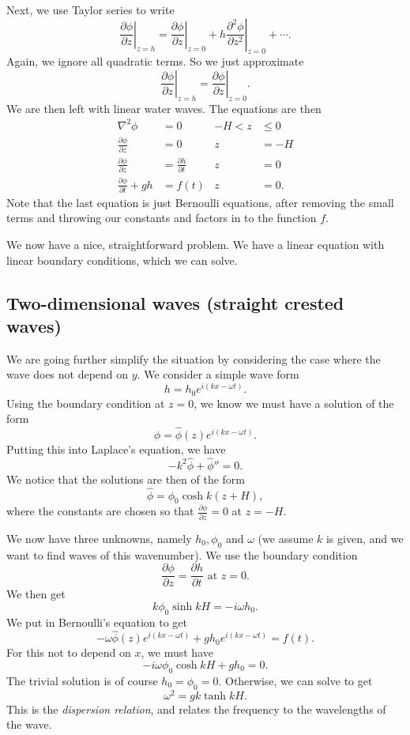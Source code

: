 \documentclass[a4paper]{article}
\begin{document}
Next, we use Taylor series to write
\[
  \left.\frac{\partial \phi}{\partial z}\right|_{z = h} = \left.\frac{\partial \phi}{\partial z}\right|_{z = 0} + h \left.\frac{\partial^2 \phi}{\partial z^2}\right|_{z = 0} + \cdots.
\]
Again, we ignore all quadratic terms. So we just approximate
\[
  \left.\frac{\partial \phi}{\partial z}\right|_{z = h} = \left.\frac{\partial \phi}{\partial z}\right|_{z = 0}.
\]
We are then left with linear water waves. The equations are then
\begin{align*}
  \nabla^2 \phi &= 0 & -H < z &\leq 0\\
  \frac{\partial \phi}{\partial z} &= 0 & z &= -H\\
  \frac{\partial \phi}{\partial z} &= \frac{\partial h}{\partial t} & z &= 0\\
  \frac{\partial \phi}{\partial t} + gh &= f(t) & z &= 0.
\end{align*}
Note that the last equation is just Bernoulli equations, after removing the small terms and throwing our constants and factors in to the function $f$.

We now have a nice, straightforward problem. We have a linear equation with linear boundary conditions, which we can solve.

\subsection{Two-dimensional waves (straight crested waves)}
We are going further simplify the situation by considering the case where the wave does not depend on $y$. We consider a simple wave form
\[
  h = h_0 e^{i(kx - \omega t)}.
\]
Using the boundary condition at $z = 0$, we know we must have a solution of the form
\[
  \phi = \hat{\phi}(z) e^{i(kx - \omega t)}.
\]
Putting this into Laplace's equation, we have
\[
  -k^2 \hat{\phi} + \hat{\phi}'' = 0.
\]
We notice that the solutions are then of the form
\[
  \hat{\phi} = \phi_0 \cosh k(z + H),
\]
where the constants are chosen so that $\frac{\partial \phi}{\partial z} = 0$ at $z = -H$.

We now have three unknowns, namely $h_0, \phi_0$ and $\omega$ (we assume $k$ is given, and we want to find waves of this wavenumber). We use the boundary condition
\[
  \frac{\partial \phi}{\partial z} = \frac{\partial h}{\partial t}\text{ at }z = 0.
\]
We then get
\[
  k \phi_0 \sinh kH = -i \omega h_0.
\]
We put in Bernoulli's equation to get
\[
  -\omega \hat{\phi}(z) e^{i(kx - \omega t)} + g h_0 e^{i(kx - \omega t)} = f(t).
\]
For this not to depend on $x$, we must have
\[
  -i\omega \phi_0 \cosh kH + gh_0 = 0.
\]
The trivial solution is of course $h_0 = \phi_0 = 0$. Otherwise, we can solve to get
\[
  \omega^2 = gk \tanh kH.
\]
This is the \emph{dispersion relation}, and relates the frequency to the wavelengths of the wave.
\end{document}
